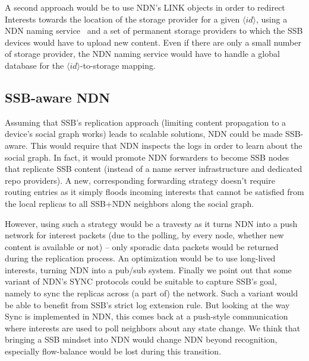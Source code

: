 \documentclass[10pt,sigconf,rewiew]{acmart}
\begin{document}
A second approach would be to use NDN's LINK objects in order to redirect
Interests towards the location of the storage provider for a given
$\langle id\rangle$, using a NDN naming service~\cite{DBLP:conf/icccn/AfanasyevJYTXM017} and a set of
permanent storage providers to which the SSB devices would
have to upload new content.
Even if there are only a small number of storage provider,
the NDN naming service would have to
handle a global database for the $\langle id\rangle$-to-storage
mapping.



\subsection{SSB-aware NDN}

Assuming that SSB's replication approach (limiting content propagation
to a device's social graph works) leads to scalable solutions, NDN
could be made SSB-aware. This would require that NDN inspects the logs
in order to learn about the social graph. In fact, it would promote
NDN forwarders to become SSB nodes that replicate SSB content (instead
of a name server infrastructure and dedicated repo providers). A new,
corresponding forwarding strategy doesn't require routing entries as
it simply floods incoming interests that cannot be satisfied from the
local replicas to all SSB+NDN neighbors along the social graph.

However, using such a strategy would be a travesty as it turns NDN
into a push network for interest packets (due to the polling, by every
node, whether new content is available or not) -- only sporadic data
packets would be returned during the replication process. An
optimization would be to use long-lived interests, turning NDN into a
pub/sub system. Finally we point out that some variant of NDN's SYNC
protocols could be suitable to capture SSB's goal, namely to sync the
replicas across (a part of) the network. Such a variant would be able
to benefit from SSB's strict log extension rule. But looking at the
way Sync is implemented in NDN, this comes back at a push-style
communication where interests are used to poll neighbors about any
state change. We think that bringing a SSB mindset into NDN would
change NDN beyond recognition, especially flow-balance would be
lost during this transition.
\end{document}
